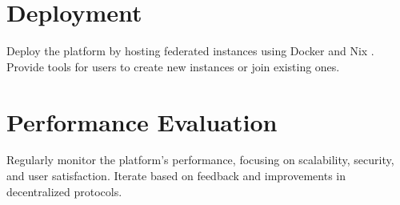 \section{Deployment}
Deploy the platform by hosting federated instances using Docker and Nix . Provide tools for users to create new instances or join existing ones.

\section{Performance Evaluation}
Regularly monitor the platform’s performance, focusing on scalability, security, and user satisfaction. Iterate based on feedback and improvements in decentralized protocols.
